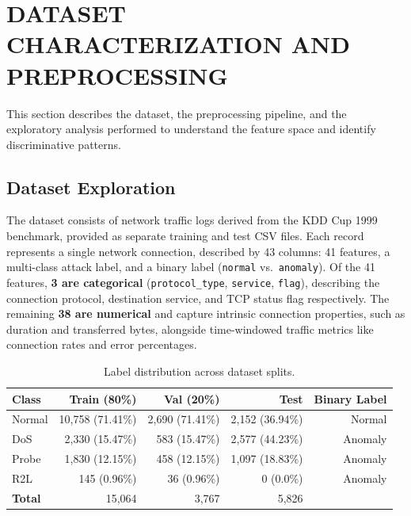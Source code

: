 
\section{DATASET CHARACTERIZATION AND PREPROCESSING} \label{sec:task1}

This section describes the dataset, the preprocessing pipeline, and the exploratory analysis performed to understand the feature space and identify discriminative patterns.

\subsection{Dataset Exploration} \label{sec:dataset}

    The dataset consists of network traffic logs derived from the KDD Cup 1999 benchmark, provided as separate training and test CSV files.
    Each record represents a single network connection, described by 43 columns: 41 features, a multi-class attack label, and a binary label (\texttt{normal} vs.\ \texttt{anomaly}).
    Of the 41 features, \textbf{3 are categorical} (\texttt{protocol\_type}, \texttt{service}, \texttt{flag}), describing the connection protocol, destination service, and TCP status flag respectively. The remaining \textbf{38 are numerical} and capture intrinsic connection properties, such as duration and transferred bytes, alongside time-windowed traffic metrics like connection rates and error percentages.

    \begin{table}[H]
        \centering
        \begin{tabular}{@{}lrrrr@{}}
            \toprule
            \textbf{Class} & \textbf{Train (80\%)} & \textbf{Val (20\%)} & \textbf{Test} & \textbf{Binary Label} \\
            \midrule
            Normal    & 10,758 (71.41\%) & 2,690 (71.41\%) & 2,152 (36.94\%) & Normal \\
            DoS       & 2,330  (15.47\%) & 583   (15.47\%) & 2,577 (44.23\%) & Anomaly \\
            Probe     & 1,830  (12.15\%) & 458   (12.15\%) & 1,097 (18.83\%) & Anomaly \\
            R2L       & 145    (0.96\%)  & 36    (0.96\%)  & 0     (0.0\%)  & Anomaly \\
            \midrule
            \textbf{Total} & 15,064 & 3,767 & 5,826 & \\
            \bottomrule
        \end{tabular}
        \vspace{0.5em}
        \caption{Label distribution across dataset splits.}
        \label{tab:label_distribution}
    \end{table}


